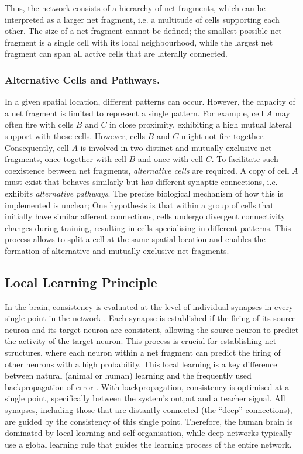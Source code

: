Thus, the network consists of a hierarchy of net fragments, which can be interpreted as a larger net fragment, i.e. a multitude of cells supporting each other.
The size of a net fragment cannot be defined; the smallest possible net fragment is a single cell with its local neighbourhood, while the largest net fragment can span all active cells that are laterally connected.

\subsubsection{Alternative Cells and Pathways.}
In a given spatial location, different patterns can occur.
However, the capacity of a net fragment is limited to represent a single pattern.
For example, cell $A$ may often fire with cells $B$ and $C$ in close proximity, exhibiting a high mutual lateral support with these cells.
However, cells $B$ and $C$ might not fire together. Consequently, cell $A$ is involved in two distinct and mutually exclusive net fragments, once together with cell $B$ and once with cell $C$.
To facilitate such coexistence between net fragments, \emph{alternative cells} are required. A copy of cell $A$ must exist that behaves similarly but has different synaptic connections, i.e. exhibits \emph{alternative pathways}.
The precise biological mechanism of how this is implemented is unclear; One hypothesis is that within a group of cells that initially have similar afferent connections, cells undergo divergent connectivity changes during training, resulting in cells specialising in different patterns. This process allows to split a cell at the same spatial location and enables the formation of alternative and mutually exclusive net fragments.

\subsection{Local Learning Principle}
In the brain, consistency is evaluated at the level of individual synapses in every single point in the network . Each synapse is established if the firing of its source neuron and its target neuron are consistent, allowing the source neuron to predict the activity of the target neuron. This process is crucial for establishing net structures, where each neuron within a net fragment can predict the firing of other neurons with a high probability.
This local learning is a key difference between natural (animal or human) learning and the frequently used backpropagation of error . With backpropagation, consistency is optimised at a single point, specifically between the system's output and a teacher signal. All synapses, including those that are distantly connected (the ``deep'' connections), are guided by the consistency of this single point. Therefore, the human brain is dominated by local learning and self-organisation, while deep networks typically use a global learning rule that guides the learning process of the entire network.



